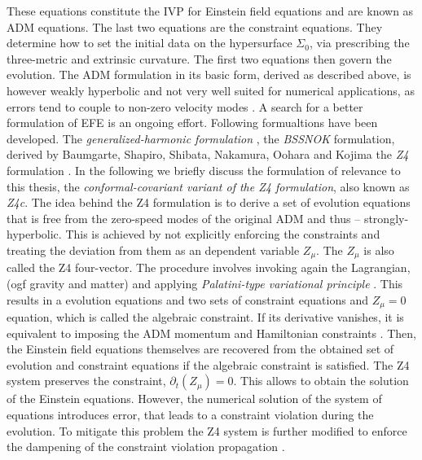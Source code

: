 These equations constitute the IVP for Einstein field equations and are known as ADM equations. The last two equations are the constraint equations. They determine how to set the initial data on the hypersurface $\Sigma_0$, via prescribing the three-metric and extrinsic curvature. The first two equations then govern the evolution.
The ADM formulation in its basic form, derived as described above, is however weakly hyperbolic \cite{Baumgarte:2002jm} and not very well suited for numerical applications, as errors tend to couple to non-zero velocity modes \cite{Alcubierre:1999rt}.
A search for a better formulation of EFE is an ongoing effort. Following formualtions have been developed. 
The \textit{generalized-harmonic formulation} \cite{Friedrich:1985,Lindblom:2005qh,Lindblom:2009}, 
the \textit{BSSNOK} formulation, derived by Baumgarte, Shapiro, Shibata, Nakamura, Oohara and Kojima \cite{Nakamura1987,Shibata:1995we,Baumgarte:1998te} 
the \textit{Z4} formulation \cite{Bona:2003fj,Bernuzzi:2009ex,Ruiz:2010qj,Weyhausen:2011cg,Alic:2011gg}.
In the following we briefly discuss the formulation of relevance to this thesis, the \textit{conformal-covariant variant of the Z4 formulation}, also known as \textit{Z4c}.
The idea behind the Z4 formulation is to derive a set of evolution equations that is free from the zero-speed modes of the original ADM and thus -- strongly-hyperbolic. 
This is achieved by not explicitly enforcing the constraints and treating the deviation from them as an dependent variable $Z_{\mu}$. The $Z_{\mu}$ is also called the Z4 four-vector.
The procedure involves invoking again the Lagrangian, (ogf gravity and matter) and applying \textit{Palatini-type variational principle} \cite{Bona:2010is}. This results in a evolution equations and two sets of constraint equations and $Z_{\mu}=0$ equation, which is called the algebraic constraint. If its derivative vanishes, it is equivalent to imposing the ADM momentum and Hamiltonian constraints \cite{Bona:2009}. 
Then, the Einstein field equations themselves are recovered from the obtained set of evolution and constraint equations if the algebraic constraint is satisfied.
The Z4 system preserves the constraint, $\partial_t (Z_{\mu})= 0$. This allows to obtain the solution of the Einstein equations. 
However, the numerical solution of the system of equations introduces error, that leads to a constraint violation during the evolution. To mitigate this problem the Z4 system is further modified to enforce the dampening of the constraint violation propagation \cite{Gundlach:2005eh}.
